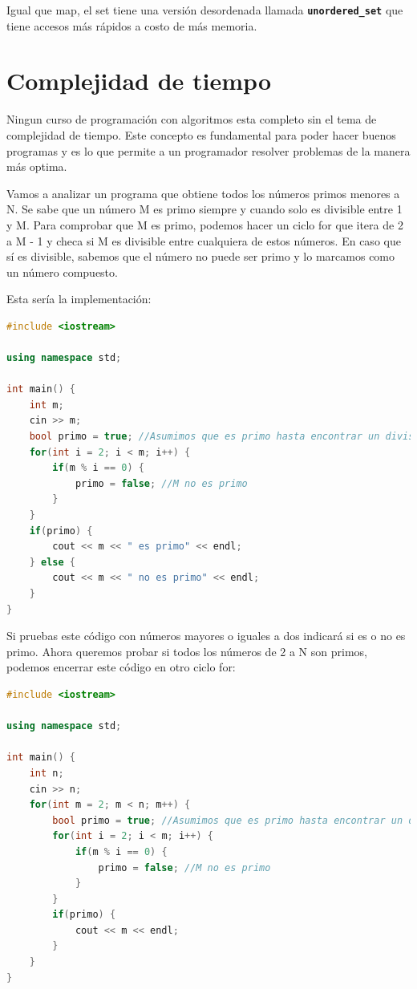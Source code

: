 \documentclass{article}
\begin{document}
Igual que map, el set tiene una versión desordenada llamada \textbf{\lstinline{unordered_set}} que tiene accesos más rápidos a costo de más memoria.

\section{Complejidad de tiempo}

Ningun curso de programación con algoritmos esta completo sin el tema de complejidad de tiempo. Este concepto es fundamental para poder hacer buenos programas y es lo que permite a un programador resolver problemas de la manera más optima.

Vamos a analizar un programa que obtiene todos los números primos menores a N. Se sabe que un número M es primo siempre y cuando solo es divisible entre 1 y M. Para comprobar que M es primo, podemos hacer un ciclo for que itera de 2 a M - 1 y checa si M es divisible entre cualquiera de estos números. En caso que sí es divisible, sabemos que el número no puede ser primo y lo marcamos como un número compuesto.

Esta sería la implementación:

\begin{lstlisting}[language=C++, title=Probando si M es primo]
#include <iostream>

using namespace std;

int main() {
	int m;
	cin >> m;
	bool primo = true; //Asumimos que es primo hasta encontrar un divisor
	for(int i = 2; i < m; i++) {
		if(m % i == 0) {
			primo = false; //M no es primo
		}
	}
	if(primo) {
		cout << m << " es primo" << endl;
	} else {
		cout << m << " no es primo" << endl;
	}
}
\end{lstlisting}

Si pruebas este código con números mayores o iguales a dos indicará si es o no es primo. Ahora queremos probar si todos los números de 2 a N son primos, podemos encerrar este código en otro ciclo for:

\begin{lstlisting}[language=C++, title=Encontrando primos menores que N]
#include <iostream>

using namespace std;

int main() {
	int n;
	cin >> n;
	for(int m = 2; m < n; m++) {
		bool primo = true; //Asumimos que es primo hasta encontrar un divisor
		for(int i = 2; i < m; i++) {
			if(m % i == 0) {
				primo = false; //M no es primo
			}
		}
		if(primo) {
			cout << m << endl;
		}
	}
}
\end{lstlisting}
\end{document}
